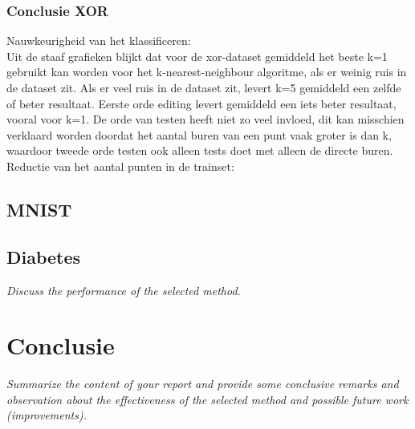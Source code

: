 \documentclass{article}
\begin{document}

\subsubsection{Conclusie XOR}

Nauwkeurigheid van het klassificeren: \\
Uit de staaf grafieken blijkt dat voor de xor-dataset gemiddeld het beste k=1 gebruikt kan worden voor het k-nearest-neighbour algoritme, als er weinig ruis in de dataset zit.  Als er veel ruis in de dataset zit, levert k=5 gemiddeld een zelfde of beter resultaat.
Eerste orde editing levert gemiddeld een iets beter resultaat, vooral voor k=1. De orde van testen heeft niet zo veel invloed, dit kan misschien verklaard worden doordat het aantal buren van een punt vaak groter is dan k, waardoor tweede orde testen ook alleen tests doet met alleen de directe buren.\\

Reductie van het aantal punten in de trainset: \\




\subsection{MNIST}

\subsection{Diabetes}



\emph{Discuss the performance of the selected method.}\\



\section{Conclusie}
\emph{Summarize the content of your report and provide some conclusive remarks and observation about the effectiveness of the selected method and possible future work (improvements).} \\
\end{document}
